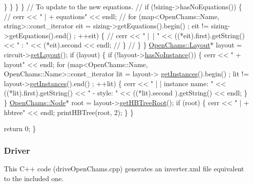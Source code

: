 \begin{DoxyCodeInclude}
                    \}
                \}
            \}
        \}
        \textcolor{comment}{// To update to the new equations.}
        \textcolor{comment}{// if (!sizing->hasNoEquations()) \{}
        \textcolor{comment}{//     cerr << " | + equations" << endl;}
        \textcolor{comment}{//     for (map<OpenChams::Name, string>::const\_iterator eit = sizing->getEquations().begin() ; eit
       != sizing->getEquations().end() ; ++eit) \{}
        \textcolor{comment}{//         cerr << " | | " << ((*eit).first).getString() << " : " << (*eit).second << endl;}
        \textcolor{comment}{//     \}}
        \textcolor{comment}{// \}}
    \}
    \mbox{\hyperlink{class_open_chams_1_1_layout}{OpenChams::Layout}}* layout = circuit->\mbox{\hyperlink{class_open_chams_1_1_circuit_a403a908943f9a3e820fd25a86d00531d}{getLayout}}();
    \textcolor{keywordflow}{if} (layout) \{
       \textcolor{keywordflow}{if} (!layout->\mbox{\hyperlink{class_open_chams_1_1_layout_af27a31f10fcf22daa64f35c9c6bd2cda}{hasNoInstance}}()) \{
          cerr << \textcolor{stringliteral}{" + layout"} << endl;
          \textcolor{keywordflow}{for} (map<OpenChams::Name, OpenChams::Name>::const\_iterator lit = layout->
      \mbox{\hyperlink{class_open_chams_1_1_layout_ab0550a9050b7e788b2a18452c9df21f7}{getInstances}}().begin() ; lit != layout->\mbox{\hyperlink{class_open_chams_1_1_layout_ab0550a9050b7e788b2a18452c9df21f7}{getInstances}}().end() ; ++lit) \{
             cerr << \textcolor{stringliteral}{" | | instance name: "} << ((*lit).first).getString() << \textcolor{stringliteral}{" - style: "} << ((*lit).second
      ).getString() << endl;
          \}
       \}
       \mbox{\hyperlink{class_open_chams_1_1_node}{OpenChams::Node}}* root = layout->\mbox{\hyperlink{class_open_chams_1_1_layout_a13df4992219ef28a7dc014e9f5f0566a}{getHBTreeRoot}}();
       \textcolor{keywordflow}{if} (root) \{
           cerr << \textcolor{stringliteral}{" | + hbtree"} << endl;
           printHBTree(root, 2);
       \}
    \}


    \textcolor{keywordflow}{return} 0;
\}

\end{DoxyCodeInclude}
\hypertarget{openchams_openChamsDriveC}{}\subsubsection{Driver}\label{openchams_openChamsDriveC}
This C++ code ({\ttfamily drive\+Open\+Chams.\+cpp}) generates an inverter.\+xml file equivalent to the included one. 

